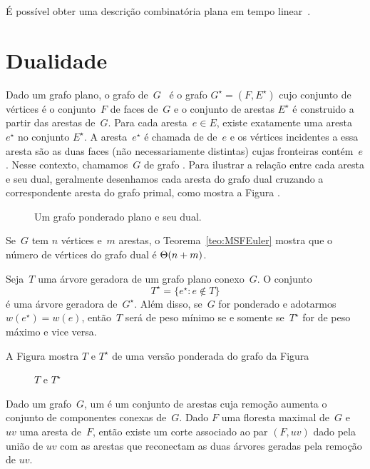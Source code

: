 É possível obter uma descrição combinatória plana em tempo linear~.

\section{Dualidade}


Dado um grafo plano, o grafo  de~$G$~\cite{planarTheoryAlgorith} é o grafo $G^\star = (F,E^\star)$ cujo conjunto de vértices é o conjunto~$F$ de faces de~$G$ e o conjunto de arestas $E^\star$ é construido a partir das arestas de~$G$.
Para cada aresta~$e\in E$, existe exatamente uma aresta~$e^\star$ no conjunto $E^\star$.
A aresta~$e^\star$ é chamada de  de~$e$ e os vértices incidentes a essa aresta são as duas faces (não necessariamente distintas) cujas fronteiras contém~$e$.
Nesse contexto, chamamos~$G$ de grafo .
Para ilustrar a relação entre cada aresta e seu dual, geralmente desenhamos cada aresta do grafo dual cruzando a correspondente aresta do grafo primal, como mostra a Figura .

\begin{figure}[htb]
\scalebox{1.5}{
\centering

}
\caption{Um grafo ponderado plano e seu dual.}
\label{fig:MSF-basico-1}
\end{figure}


Se~$G$ tem $n$ vértices e~$m$ arestas, o Teorema~\ref{teo:MSFEuler} mostra que o número de vértices do grafo dual é $\Theta(n+m)$.

\begin{theorem}
\label{teo:MSFdual}
Seja~$T$ uma árvore geradora de um grafo plano conexo~$G$. O conjunto
$$
T^\star = \{e^\star:e\notin T\}
$$
é uma árvore geradora de~$G^\star$.
Além disso, se~$G$ for ponderado e adotarmos $w(e^\star) = w(e)$, então~$T$ será de peso mínimo se e somente se~$T^\star$ for de peso máximo e vice versa.
\end{theorem}

A Figura  mostra $T$ e $T^\star$ de uma versão ponderada do grafo da Figura 


\begin{figure}[htb]
\scalebox{1.5}{
\centering

}
\caption{$T$ e $T^\star$}
\label{fig:MSF-figura-2}
\end{figure}



Dado um grafo~$G$, um  é um conjunto de arestas cuja remoção aumenta o conjunto de componentes conexas de~$G$.
Dado $F$ uma floresta maximal de~$G$ e~$uv$ uma aresta de~$F$, então existe um corte associado ao par $(F, uv)$ dado pela união de $uv$ com as arestas que reconectam as duas árvores geradas pela remoção de $uv$.


